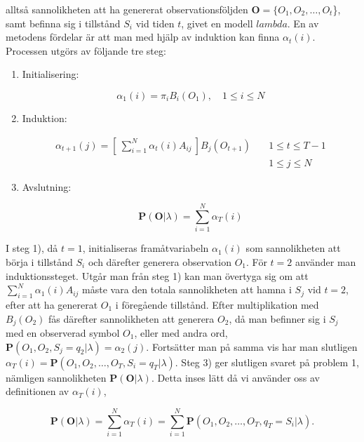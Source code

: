 \documentclass[../rapport_MVEX01-11-05]{subfiles}
\begin{document}
alltså sannolikheten att ha genererat observationsföljden $\textbf{O}
= \{O_1,O_2,\dots,O_t$\}, samt befinna sig i tillstånd $S_i$ vid tiden
$t$, givet en modell $lambda$. En av metodens fördelar är att man med
hjälp av induktion kan finna $\alpha_t(i)$. Processen utgörs av
följande tre steg: 

\begin{enumerate}
\item Initialisering:

\begin{equation*}
\alpha_1(i) = \pi_iB_i(O_1), \quad 1\leq i \leq N
\end{equation*}

\item Induktion:

\begin{align*}
\alpha_{t+1}(j) =
\left[~\sum_{i=1}^N\alpha_t(i)A_{ij}~\right]B_j(O_{t+1}) \quad &1 \leq t \leq T-1 \\
&1 \leq j \leq N
\end{align*}

\item Avslutning:

\begin{equation*}
\textbf{P}(\textbf{O}|\lambda) = \sum_{i=1}^N\alpha_T(i)
\end{equation*}
\end{enumerate}

I steg 1), då $t=1$, initialiseras framåtvariabeln $\alpha_1(i)$ som
sannolikheten att börja i tillstånd $S_i$ och därefter generera
observation $O_1$. För $t=2$ använder man induktionssteget. Utgår man
från steg 1) kan man övertyga sig om att
$\sum_{i=1}^N\alpha_1(i)A_{ij}$ måste vara den totala sannolikheten
att hamna i $S_j$ vid $t=2$, efter att ha genererat $O_1$ i föregående
tillstånd. Efter multiplikation med $B_j(O_{2})$ fås därefter
sannolikheten att generera $O_2$, då man befinner sig i $S_j$ med en
observerad symbol $O_1$, eller med andra ord, $\textbf{P}(O_1,O_2,S_j
= q_2 | \lambda) = \alpha_2(j)$. Fortsätter man på samma vis har man
slutligen $\alpha_T(i) = \textbf{P}(O_1,O_2,\dots,O_T,S_i = q_T |
\lambda)$. Steg 3) ger slutligen svaret på problem 1, nämligen
sannolikheten $\textbf{P}(\textbf{O}|\lambda)$. Detta inses lätt då vi
använder oss av definitionen av $\alpha_T(i)$, 

\begin{equation*}
\textbf{P}(\textbf{O}|\lambda) = \sum_{i=1}^N\alpha_T(i) =
\sum_{i=1}^N\textbf{P}(O_1,O_2,\dots,O_T,q_T = S_i|\lambda). 
\end{equation*} 
\end{document}
